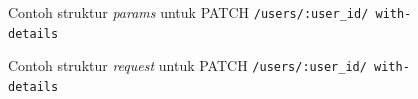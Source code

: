 \begin{figure}
    \centering
    \caption{Contoh struktur \textit{params} untuk PATCH \texttt{/users/{:user\_id}/ with-details}}
    \label{fig:params_users_with_details_patch}
\end{figure}
\begin{figure}
    \centering
    \caption{Contoh struktur \textit{request} untuk PATCH \texttt{/users/{:user\_id}/ with-details}}
    \label{fig:request_users_with_details_patch}
\end{figure}
